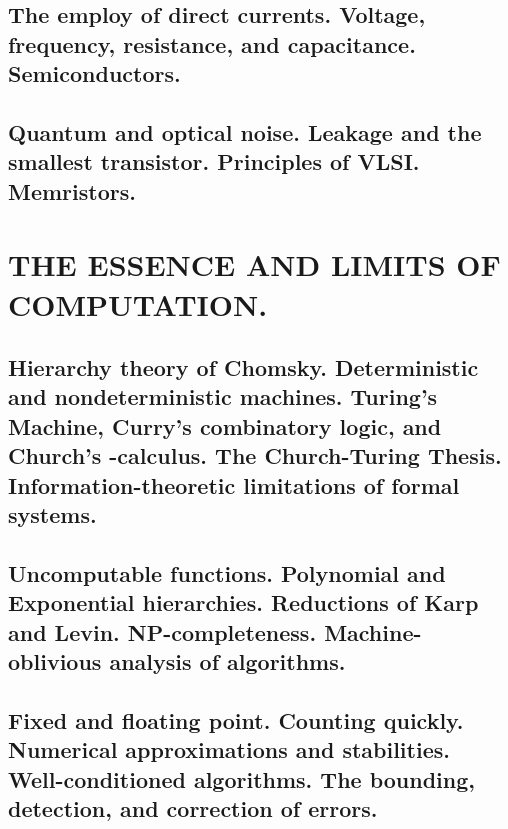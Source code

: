 \documentclass[letterpaper,draft]{memoir}
\begin{document}
\chapter{The employ of direct currents. Voltage, frequency, resistance, and capacitance. Semiconductors.}

\chapter{Quantum and optical noise. Leakage and the smallest transistor. Principles
of VLSI\@. Memristors.}


\part{THE ESSENCE AND LIMITS OF COMPUTATION\@.}


\chapter{Hierarchy theory of Chomsky. Deterministic and nondeterministic machines.
Turing's Machine, Curry's combinatory logic, and Church's \latintext-calculus. The
Church-Turing Thesis. Information-theoretic limitations of formal systems.}

\chapter{Uncomputable functions. Polynomial and Exponential hierarchies. Reductions
of Karp and Levin. NP-completeness. Machine-oblivious analysis of algorithms.}

\chapter{Fixed and floating point. Counting quickly. Numerical approximations and
stabilities. Well-conditioned algorithms. The bounding, detection, and
correction of errors.}
\end{document}
